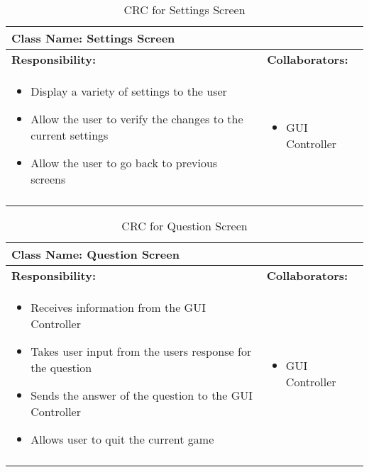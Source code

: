 \documentclass[titlepage]{article}
\begin{document}
	\begin{longtable}{| p{} | p{} |}
			\hline
			 \multicolumn{2}{|l|}{\textbf{Class Name: Settings Screen}} \\
			\hline
			\textbf{Responsibility:} & \textbf{Collaborators:} \\
			\hline
				\begin{itemize}
					\item Display a variety of settings to the user
					\item Allow the user to verify the changes to the current settings
					\item Allow the user to go back to previous screens
				\end{itemize} & 
				\begin{itemize}
					\item GUI Controller
				\end{itemize} 
				\\
			\hline
		\caption{CRC for Settings Screen}
	\end{longtable}
	
	\begin{longtable}{| p{} | p{} |}
			\hline
			 \multicolumn{2}{|l|}{\textbf{Class Name: Question Screen}} \\
			\hline
			\textbf{Responsibility:} & \textbf{Collaborators:} \\
			\hline
				\begin{itemize}
					\item Receives information from the GUI Controller
					\item Takes user input from the users response for the question
					\item Sends the answer of the question to the GUI Controller
					\item Allows user to quit the current game
				\end{itemize} & 
				\begin{itemize}
					\item GUI Controller
				\end{itemize} 
				\\
			\hline
		\caption{CRC for Question Screen}
	\end{longtable}	
	
\end{document}
